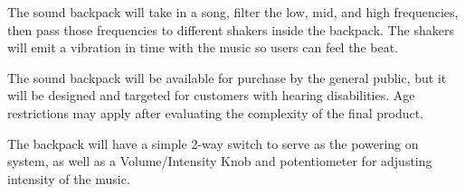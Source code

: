 The sound backpack will take in a song, filter the low, mid, and high frequencies, then pass those frequencies to different shakers inside the backpack. The shakers will emit a vibration in time with the music so users can feel the beat.

The sound backpack will be available for purchase by the general public, but it will be designed and targeted for customers with hearing disabilities. Age restrictions may apply after evaluating the complexity of the final product.

The backpack will have a simple 2-way switch to serve as the powering on system, as well as a Volume/Intensity Knob and potentiometer for adjusting intensity of the music.